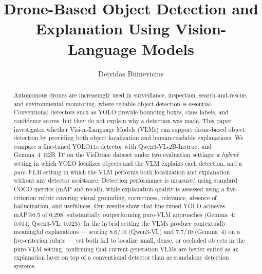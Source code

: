 \documentclass[acmtog, authorversion]{acmart}
\begin{document}
\title{Drone-Based Object Detection and Explanation Using Vision-Language Models}

\author{Deividas Buinevicius}
\renewcommand{\shortauthors}{Buinevicius}

\begin{abstract}
Autonomous drones are increasingly used in surveillance, inspection,
search-and-rescue, and environmental monitoring, where reliable object
detection is essential. Conventional detectors such as YOLO provide
bounding boxes, class labels, and confidence scores, but they do not
explain why a detection was made. This paper investigates whether
Vision-Language Models (VLMs) can support drone-based object detection
by providing both object localization and human-readable explanations.
We compare a fine-tuned YOLO11s detector with Qwen3-VL-2B-Instruct and
Gemma~4~E2B~IT on the VisDrone dataset under two evaluation settings:
a \emph{hybrid} setting in which YOLO localizes objects and the VLM
explains each detection, and a \emph{pure-VLM} setting in which the
VLM performs both localization and explanation without any detector
assistance. Detection performance is measured using standard COCO
metrics (mAP and recall), while explanation quality is assessed
using a five-criterion rubric covering visual grounding, correctness,
relevance, absence of hallucination, and usefulness.
Our results show that fine-tuned YOLO achieves mAP@0.5 of 0.298,
substantially outperforming pure-VLM approaches (Gemma~4: 0.011;
Qwen3-VL: 0.023). In the hybrid setting the VLMs produce contextually
meaningful explanations --- scoring 8.6/10 (Qwen3-VL) and 7.7/10
(Gemma~4) on a five-criterion rubric --- yet both fail to localize small, dense, or occluded objects
in the pure-VLM setting, confirming that current-generation VLMs are
better suited as an explanation layer on top of a conventional detector
than as standalone detection systems.
\end{abstract}


\maketitle
\end{document}
